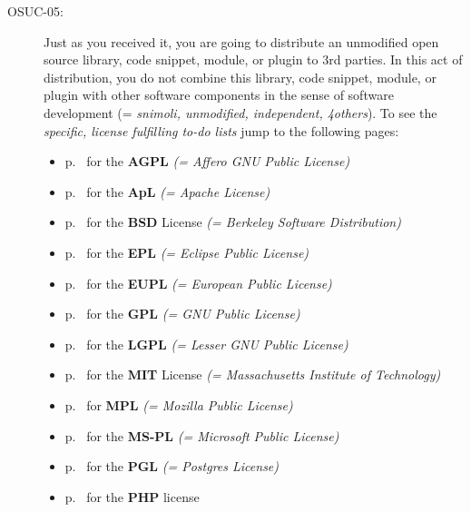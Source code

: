 \begin{description}
\item[OSUC-05:]\label{OSUC-05-DEF} Just as you received it, you are going to
distribute an unmodified open source library, code snippet, module, or plugin to
3rd parties. In this act of distribution, you do not combine this library, code
snippet, module, or plugin with other software components in the sense of
software development (= \textit{snimoli, unmodified, independent, 4others}).
To see the \textit{specific, license fulfilling to-do lists} jump to the
following pages:
  \begin{itemize}
    \item p.\ \pageref{OSUC-05-AGPL} for the \textbf{AGPL}
      \textit{(= Affero GNU Public License)} 
    \item p.\ \pageref{OSUC-05-Apache20} for the \textbf{ApL}
      \textit{(= Apache License)}
    \item p.\ \pageref{OSUC-05-BSD} for the \textbf{BSD} License
      \textit{(= Berkeley Software Distribution)}
    \item p.\ \pageref{OSUC-05-EPL} for the \textbf{EPL}
      \textit{(= Eclipse Public License)}     
    \item p.\ \pageref{OSUC-05-EUPL} for the \textbf{EUPL}
      \textit{(= European Public License)} 
    \item p.\ \pageref{OSUC-05-GPL} for the \textbf{GPL}
       \textit{(= GNU Public License)} 
    \item p.\ \pageref{OSUC-05-LGPL} for the \textbf{LGPL}
      \textit{(= Lesser GNU Public License)}           
    \item p.\ \pageref{OSUC-05-MIT} for the \textbf{MIT} License
       \textit{(= Massachusetts Institute of Technology)} 
    \item p.\ \pageref{OSUC-05-MPL} for \textbf{MPL}
      \textit{(= Mozilla Public License)}     
    \item p.\ \pageref{OSUC-05-MS-PL} for the \textbf{MS-PL}
      \textit{(= Microsoft Public License)} 
    \item p.\ \pageref{OSUC-05-PGL} for the \textbf{PGL}
      \textit{(= Postgres License)} 
    \item p.\ \pageref{OSUC-05-PHP} for the \textbf{PHP} license 
  \end{itemize}


\end{description}
